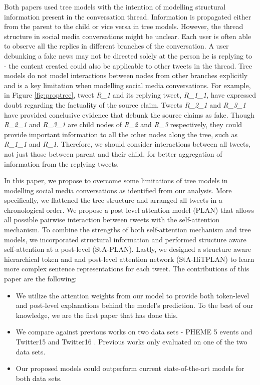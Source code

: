 \documentclass[letterpaper]{article} %
\begin{document}
Both papers used tree models with the intention of modelling structural information present in the conversation thread. Information is propagated either from the parent to the child or vice versa in tree models. However, the thread structure in social media conversations might be unclear. Each user is often able to observe all the replies in different branches of the conversation. A user debunking a fake news may not be directed solely at the person he is replying to - the content created could also be applicable to other tweets in the thread. Tree models do not model interactions between nodes from other branches explicitly and is a key limitation when modelling social media conversations. For example, in Figure \ref{fig:proptree}, tweet \textit{R\_1} and its replying tweet, \textit{R\_1\_1}, have expressed doubt regarding the factuality of the source claim. Tweets \textit{R\_2\_1} and \textit{R\_3\_1} have provided conclusive evidence that debunk the source claims as fake. Though \textit{R\_2\_1} and \textit{R\_3\_1} are child nodes of \textit{R\_2} and \textit{R\_3} respectively, they could provide important information to all the other nodes along the tree, such as \textit{R\_1\_1} and \textit{R\_1}. Therefore, we should consider interactions between all tweets, not just those between parent and their child, for better aggregation of information from the replying tweets. 

In this paper, we propose to overcome some limitations of tree models in modelling social media conversations as identified from our analysis. More specifically, we flattened the tree structure and arranged all tweets in a chronological order. We propose a post-level attention model (PLAN) that allows all possible pairwise interaction between tweets with the self-attention mechanism. To combine the strengths of both self-attention mechanism and tree models, we incorporated structural information and performed structure aware self-attention at a post-level (StA-PLAN). Lastly, we designed a structure aware hierarchical token and and post-level attention network (StA-HiTPLAN) to learn more complex sentence representations for each tweet. \newline
\newline 
The contributions of this paper are the following:
\begin{itemize}
    \item We utilize the attention weights from our model to provide both token-level and post-level explanations behind the model's prediction. To the best of our knowledge, we are the first paper that has done this.
    \item We compare against previous works on two data sets - PHEME 5 events \cite{kochkina_liakata_zubiaga_2018} and Twitter15 and Twitter16 \cite{ma17}. Previous works only evaluated on one of the two data sets. 
    \item  Our proposed models could outperform current state-of-the-art models for both data sets.
\end{itemize}
\end{document}
